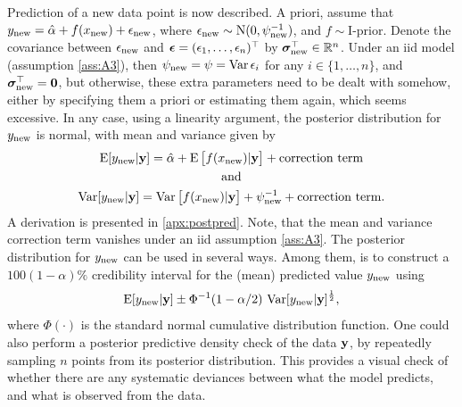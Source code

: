 Prediction of a new data point is now described.
A priori, assume that $y_{\text{new}} = \hat\alpha + f(x_{\text{new}}) + \epsilon_{\text{new}}$, where $\epsilon_{\text{new}} \sim \operatorname{N}(0,\psi^{-1}_{\text{new}})$, and $f\sim \text{I-prior}$.
Denote the covariance between $\epsilon_{\text{new}}$ and ${\bm\epsilon} = (\epsilon_1,\dots,\epsilon_n)^\top$ by ${\bm\sigma}_{\text{new}}^\top \in \mathbb{R}^n$.
Under an iid model (assumption \ref{ass:A3}), then $\psi_{\text{new}} = \psi = \operatorname{Var} \epsilon_i$ for any $i\in\{1,\dots,n\}$, and ${\bm\sigma}_{\text{new}}^\top={\mathbf 0}$, but otherwise, these extra parameters need to be dealt with somehow, either by specifying them a priori or estimating them again, which seems excessive.
In any case, using a linearity argument, the posterior distribution for $y_{\text{new}}$ is normal, with mean and variance given by
\begin{gather}
  \operatorname{E}[y_{\text{new}}|{\mathbf y}] = \hat\alpha + \operatorname{E} \big[ f(x_{\text{new}}) |{\mathbf y} \big] + \text{correction term} \\
  \text{and} \nonumber \\
  \operatorname{Var}[y_{\text{new}}|{\mathbf y}] 
  = \operatorname{Var}\big[f(x_{\text{new}})|{\mathbf y}\big] + \psi^{-1}_{\text{new}} + \text{correction term}.
\end{gather}
A derivation is presented in \cref{apx:postpred}.
Note, that the mean and variance correction term vanishes under an iid assumption \ref{ass:A3}.
The posterior distribution for $y_{\text{new}}$ can be used in several ways. 
Among them, is to construct a $100(1 - \alpha)\%$ credibility interval for the (mean) predicted value $y_{\text{new}}$ using
\[
  \operatorname{E}[y_{\text{new}}|{\mathbf y}] \pm \Phi^{-1}(1 - \alpha/2) \, \operatorname{Var}[y_{\text{new}}|{\mathbf y}]^{\frac{1}{2}},
\]
where $\Phi(\cdot)$ is the standard normal cumulative distribution function.
One could also perform a posterior predictive density check of the data ${\mathbf y}$, by repeatedly sampling $n$ points from its posterior distribution.
This provides a visual check of whether there are any systematic deviances between what the model predicts, and what is observed from the data.

